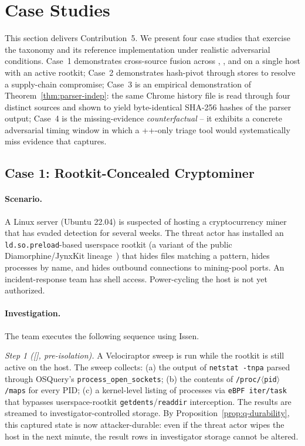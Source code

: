 \section{Case Studies}
\label{sec:cases}

This section delivers Contribution~5. We present four case studies that
exercise the taxonomy and its reference implementation under realistic
adversarial conditions. Case~1 demonstrates cross-source fusion across
, , and  on a single host with an active rootkit;
Case~2 demonstrates hash-pivot through  stores to resolve a
supply-chain compromise; Case~3 is an empirical demonstration of
Theorem~\ref{thm:parser-indep}: the same Chrome history file is read
through four distinct sources and shown to yield byte-identical SHA-256
hashes of the parser output; Case~4 is the missing-evidence
\emph{counterfactual} -- it exhibits a concrete adversarial timing window
in which a ++-only triage tool would systematically
miss evidence that  captures.

\subsection{Case 1: Rootkit-Concealed Cryptominer}
\label{sec:case1}

\paragraph{Scenario.}
A Linux server (Ubuntu 22.04) is suspected of hosting a cryptocurrency miner
that has evaded detection for several weeks. The threat actor has
installed an \texttt{ld.so.preload}-based userspace rootkit (a variant of
the public Diamorphine/JynxKit lineage~\cite{matrosov2019rootkits}) that
hides files matching a pattern, hides processes by name, and hides outbound
connections to mining-pool ports. An incident-response team has shell
access. Power-cycling the host is not yet authorized.

\paragraph{Investigation.}
The team executes the following sequence using Issen.

\noindent\emph{Step 1 ([], pre-isolation).} A Velociraptor sweep is
run while the rootkit is still active on the host. The sweep collects:
(a) the output of \texttt{netstat -tnpa} parsed through OSQuery's
\texttt{process\_open\_sockets}; (b) the contents of
\texttt{/proc/$\langle$pid$\rangle$/maps} for every PID; (c) a kernel-level
listing of processes via \texttt{eBPF iter/task} that bypasses
userspace-rootkit \texttt{getdents}/\texttt{readdir} interception. The
results are streamed to investigator-controlled storage. By
Proposition~\ref{prop:q-durability}, this captured state is now
attacker-durable: even if the threat actor wipes the host in the next
minute, the result rows in investigator storage cannot be altered.

